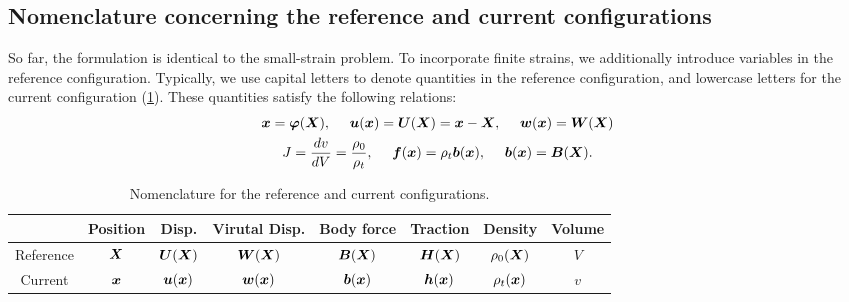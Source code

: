 \subsection{Nomenclature concerning the reference and current configurations}
So far, the formulation is identical to the small-strain problem. 
To incorporate finite strains, we additionally introduce variables in the reference configuration. 
Typically, we use capital letters to denote quantities in the reference configuration, and lowercase letters for the current configuration (\cref{tab:final1_ref_cur}).
These quantities satisfy the following relations:
\begin{equation}
\begin{gathered}
    \bm{x} = \bm{\varphi}(\bm{X}), ~~~~ \bm{u}(\bm{x}) = \bm{U}(\bm{X}) = \bm{x} - \bm{X}, ~~~~ \bm{w}(\bm{x}) = \bm{W}(\bm{X}) \\
    J = \frac{dv}{dV} = \frac{\rho_0}{\rho_t}, ~~~~ \bm{f}(\bm{x}) = \rho_t \bm{b}(\bm{x}), ~~~~ \bm{b}(\bm{x}) = \bm{B}(\bm{X}).
\end{gathered}
\end{equation}
\begin{table}[!ht]
\centering
\begin{tabular}{|c|c|c|c|c|c|c|c|}
    \hline
    & Position & Disp. & Virutal Disp. & Body force & Traction & Density & Volume \\
    \hline
    Reference & $\bm{X}$ & $\bm{U}(\bm{X})$ & $\bm{W}(\bm{X})$ & $\bm{B}(\bm{X})$ & $\bm{H}(\bm{X})$ & $\rho_0(\bm{X})$ & $V$ \\
    \hline
    Current & $\bm{x}$ & $\bm{u}(\bm{x})$ & $\bm{w}(\bm{x})$ & $\bm{b}(\bm{x})$ &  $\bm{h}(\bm{x})$ & $\rho_t(\bm{x})$ & $v$ \\
    \hline 
\end{tabular}
\caption{Nomenclature for the reference and current configurations.}
\label{tab:final1_ref_cur}
\end{table}

